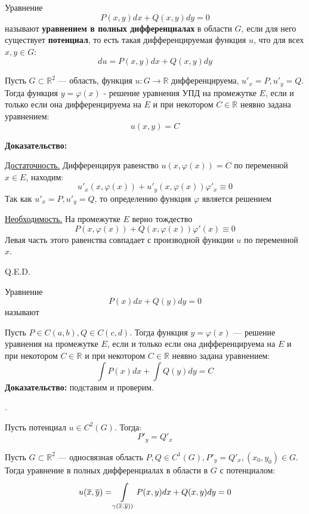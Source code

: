  Уравнение 
$$P(x,y)dx + Q(x,y) dy =0$$
называют \textbf{уравнением в полных дифференциалах} в области $G$, если для него существует \textbf{потенциал}, то есть такая дифференцируемая функция $u$, что для всех $x,y \in G$:
$$du = P(x,y)dx + Q(x,y)dy$$


Пусть $G \subset \mathbb{R}^2$ --- область, функция $u: G \rightarrow \mathbb{R}$ дифференцируема, $u'_x =P, u'_y =Q$. Тогда функция $y = \varphi(x)$ - решение уравнения УПД на промежутке $E$, если и только если она дифференцируема на $E$ и при некотором $C \in \mathbb{R}$ неявно задана уравнением:
$$u(x,y) = C$$

\textbf{Доказательство:}

\uline{Достаточность.} Дифференцируя равенство $u(x, \varphi(x))=C$ по переменной $x \in E$, находим:
$$u'_x(x,\varphi(x)) + u'_y(x,\varphi(x))\varphi'_x \equiv 0$$
Так как $u'_x = P, u'_y = Q$, то определению функция $\varphi$ является решением

\uline{Необходимость.} На промежутке $E$ верно тождество
$$P(x,\varphi(x)) + Q(x,\varphi(x))\varphi'(x) \equiv 0$$
Левая часть этого равенства совпадает с производной функции $u$ по переменной $x$.


\hfill Q.E.D.

 Уравнение
$$P(x) dx + Q(y) dy=0$$
называют 


Пусть $P \in C(a,b), Q \in C(c,d)$. Тогда функция $y =\varphi(x)$ --- решение уравнения на промежутке $E$, если и только если она дифференцируема на $E$ и при некотором $C \in \mathbb{R}$ и при некотором $C \in \mathbb{R}$ неявно задана уравнением:
$$\int P(x) dx + \int Q(y) dy = C$$
\textbf{Доказательство:} подставим и проверим.


.

Пусть потенциал $u \in C^2(G)$. Тогда:
$$P'_y = Q'_x$$


Пусть $G \subset \mathbb{R}^2$ --- односвязная область $P,Q \in C^1(G), P'_y = Q'_x, (x_0,y_0)\in G$. Тогда уравнение в полных дифференциалах в области в $G$ с потенциалом:
$$u(\overline{x}, \overline{y}) = \displaystyle\int\limits_{\gamma(\overline{x}, \overline{y}))}^{}P(x,y)dx + Q(x,y)dy =0$$
